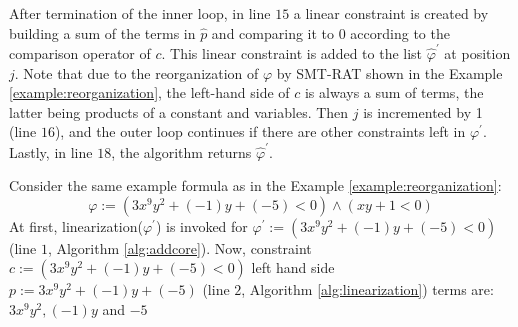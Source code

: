 \noindent After termination of the inner loop, in line $15$ a linear constraint is created by building a sum of the terms in $\hat{p}$ and comparing it to $0$ according to the comparison operator of $c$.
This linear constraint is added to the list $\hat{\varphi}^\prime$ at position $j$.
Note that due to the reorganization of $\varphi$ by SMT-RAT shown in the Example \ref{example:reorganization}, the left-hand side of $c$ is always a sum of terms, the latter being products of a constant and variables.
Then $j$ is incremented by 1 (line $16$), and the outer loop continues if there are other constraints left in $\varphi^\prime$.
Lastly, in line $18$, the algorithm returns $\hat{\varphi}^\prime$.\newline

\begin{example}
\label{example:linearization}
Consider the same example formula as in the Example \ref{example:reorganization}:
$$\varphi := (3x^9y^2 + (-1)y + (-5) < 0) \wedge (xy + 1 < 0)$$
At first, linearization($\varphi^\prime$) is invoked for $\varphi^\prime := (3x^9y^2 + (-1)y + (-5) < 0)$ (line $1$, Algorithm \ref{alg:addcore}).\newline
Now,\newline 
constraint $c := (3x^9y^2 + (-1)y + (-5) < 0)$\newline
left hand side $p := 3x^9y^2 + (-1)y + (-5)$ (line $2$, Algorithm \ref{alg:linearization})\newline
terms are: $3x^9y^2, (-1)y$ and $-5$\newline


\end{example}
